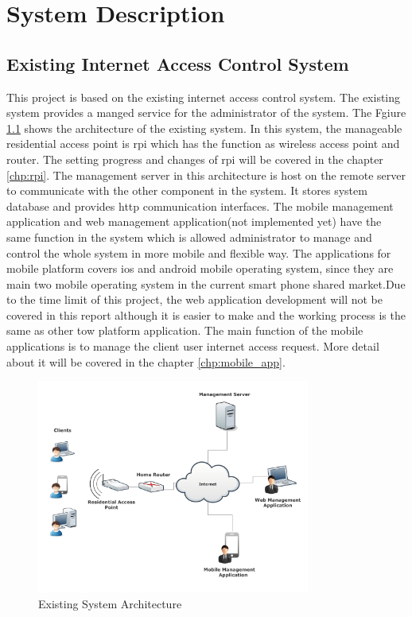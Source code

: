 \chapter{System Description}
\label{chp:system_description}

\section{Existing Internet Access Control System}
\par This project is based on the existing internet access control system. The existing system provides a manged service for the administrator of the system. The Fgiure \ref{fig:presystem} shows the architecture of the existing system. In this system, the manageable residential access point is \gls{rpi} which has the function as wireless access point and router. The setting progress and changes of \gls{rpi} will be covered in the chapter \ref{chp:rpi}. The management server in this architecture is host on the remote server to communicate with the other component in the system. It stores system database and provides \gls{http} communication interfaces. The mobile management application and web management application(not implemented yet) have the same function in the system which is allowed administrator to manage and control the whole system in more mobile and flexible way. The applications for mobile platform covers \gls{ios} and android mobile operating system, since they are main two mobile operating system in the current smart phone shared market.Due to the time limit of this project, the web application development will not be covered in this report although it is easier to make and the working process is the same as other tow platform application. The main function of the mobile applications is to manage the client user internet access request. More detail about it will be covered in the chapter \ref{chp:mobile_app}.
\begin{figure}
	\centering
    	\includegraphics[width=0.80\textwidth,natwidth=610,natheight=642]{figs/presystem.png}
  	\caption{Existing System Architecture}
  	\label{fig:presystem}
\end{figure}

